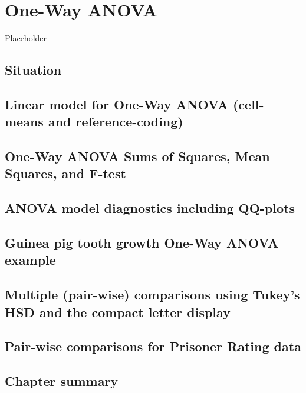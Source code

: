 \documentclass[]{book}
\begin{document}
\hypertarget{chapter3}{%
\chapter{One-Way ANOVA}\label{chapter3}}

Placeholder

\hypertarget{section3-1}{%
\section{Situation}\label{section3-1}}

\hypertarget{section3-2}{%
\section{Linear model for One-Way ANOVA (cell-means and reference-coding)}\label{section3-2}}

\hypertarget{section3-3}{%
\section{One-Way ANOVA Sums of Squares, Mean Squares, and F-test}\label{section3-3}}

\hypertarget{section3-4}{%
\section{ANOVA model diagnostics including QQ-plots}\label{section3-4}}

\hypertarget{section3-5}{%
\section{Guinea pig tooth growth One-Way ANOVA example}\label{section3-5}}

\hypertarget{section3-6}{%
\section{Multiple (pair-wise) comparisons using Tukey's HSD and the compact letter display}\label{section3-6}}

\hypertarget{section3-7}{%
\section{Pair-wise comparisons for Prisoner Rating data}\label{section3-7}}

\hypertarget{section3-8}{%
\section{Chapter summary}\label{section3-8}}
\end{document}
